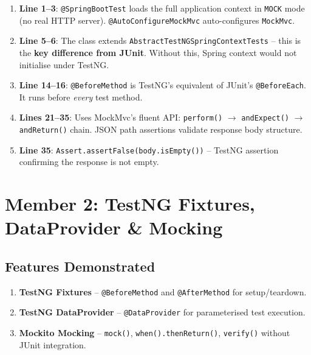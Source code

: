 \documentclass[12pt,a4paper]{article}
\begin{document}
\begin{enumerate}
    \item \textbf{Line 1--3}: \texttt{@SpringBootTest} loads the full application context in \texttt{MOCK} mode (no real HTTP server). \texttt{@AutoConfigureMockMvc} auto-configures \texttt{MockMvc}.
    \item \textbf{Line 5--6}: The class extends \texttt{AbstractTestNGSpringContextTests} -- this is the \textbf{key difference from JUnit}. Without this, Spring context would not initialise under TestNG.
    \item \textbf{Line 14--16}: \texttt{@BeforeMethod} is TestNG's equivalent of JUnit's \texttt{@BeforeEach}. It runs before \textit{every} test method.
    \item \textbf{Lines 21--35}: Uses MockMvc's fluent API: \texttt{perform()} $\rightarrow$ \texttt{andExpect()} $\rightarrow$ \texttt{andReturn()} chain. JSON path assertions validate response body structure.
    \item \textbf{Line 35}: \texttt{Assert.assertFalse(body.isEmpty())} -- TestNG assertion confirming the response is not empty.
\end{enumerate}

\section{Member 2: TestNG Fixtures, DataProvider \& Mocking}
\label{sec:member2}

\subsection{Features Demonstrated}
\begin{enumerate}
    \item \textbf{TestNG Fixtures} -- \texttt{@BeforeMethod} and \texttt{@AfterMethod} for setup/teardown.
    \item \textbf{TestNG DataProvider} -- \texttt{@DataProvider} for parameterised test execution.
    \item \textbf{Mockito Mocking} -- \texttt{mock()}, \texttt{when().thenReturn()}, \texttt{verify()} without JUnit integration.
\end{enumerate}
\end{document}
